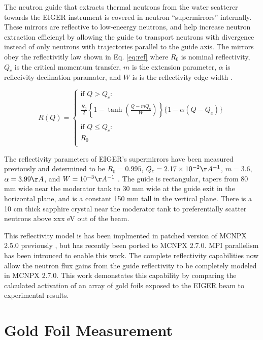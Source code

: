 \documentclass[a4paper,
              ]{jacow}
\begin{document}
The neutron guide that extracts thermal neutrons from the water scatterer towards the EIGER instrument is covered in neutron ``supermirrors'' internally.  These mirrors are reflective to low-eneergy neutrons, and help increase neutron extraction efficienyl by allowing the guide to transport neutrons with divergence instead of only neutrons with trajectories parallel to the guide axis.  The mirrors obey the reflectivitly law shown in Eq. \ref{eq:ref} where $R_0$ is nominal reflectivity, $Q_c$ is the critical momentum transfer, $m$ is the extension parameter, $\alpha$ is reflecivity declination paramater, and $W$ is is the reflectivity edge width \cite{mcnpx-ref}.

\begin{equation}\label{eq:ref}
R(Q) = 
\begin{cases}
    \mbox{if } Q > Q_c : \\
    \frac{R_0}{2}\left\{  1 - \tanh\left(  \frac{Q - m Q_c}{W}\right) \right\}\{1-\alpha(Q-Q_c)\} \\
    \\
    \mbox{if } Q \leq Q_c :\\
    R_0 \\
\end{cases}
\end{equation}

The reflectivity parameters of EIGER's supermirrors have been measured previously and determined to be $R_0=0.995$, $Q_c=2.17\times10^{-2}\AA^{-1}$, $m=3.6$, $\alpha=3.99 \AA$, and $W=10^{-3} \AA^{-1}$ \cite{eiger-uwe}.  The guide is rectangular, tapers from 80 mm wide near the moderator tank to 30 mm wide at the guide exit in the horizontal plane, and is a constant 150 mm tall in the vertical plane.  There is a 10 cm thick sapphire crystal near the moderator tank to preferentially scatter neutrons above xxx eV out of the beam.

This reflectivity model is has been implmented in patched version of MCNPX 2.5.0 previously \cite{mcnpx-ref}, but has recently been ported to MCNPX 2.7.0.  MPI parallelism has been introuced to enable this work.  The complete reflectivity capabilities now allow the neutron flux gains from the guide reflectivity to be completely modeled in MCNPX 2.7.0.  This work demonstates this capability by comparing the calculated activation of an array of gold foils exposed to the EIGER beam to experimental results.


\section{Gold Foil Measurement}
\end{document}
